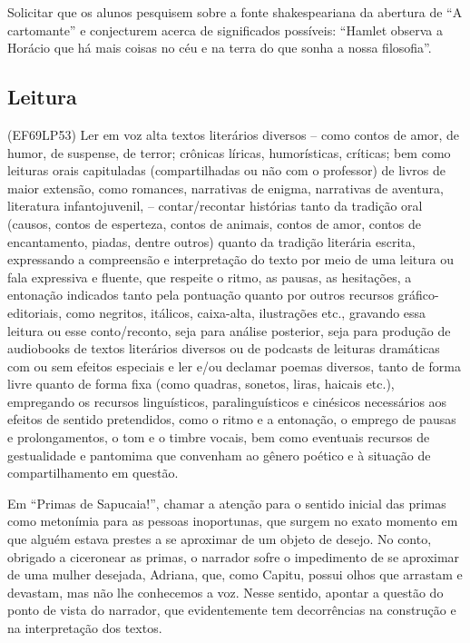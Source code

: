 Solicitar que os alunos pesquisem sobre a fonte shakespeariana da
abertura de ``A cartomante'' e conjecturem acerca de significados
possíveis: ``Hamlet observa a Horácio que há mais coisas no céu e na
terra do que sonha a nossa filosofia''. 

\subsection{Leitura}

(EF69LP53) Ler em voz alta textos literários diversos – como contos de amor, de humor, de suspense, de terror; crônicas líricas, humorísticas, críticas; bem como leituras orais capituladas (compartilhadas ou não com o professor) de livros de maior extensão, como romances, narrativas de enigma, narrativas de aventura, literatura infantojuvenil, – contar/recontar histórias tanto da tradição oral (causos, contos de esperteza, contos de animais, contos de amor, contos de encantamento, piadas, dentre outros) quanto da tradição literária escrita, expressando a compreensão e interpretação do texto por meio de uma leitura ou fala expressiva e fluente, que respeite o ritmo, as pausas, as hesitações, a entonação indicados tanto pela pontuação quanto por outros recursos gráfico-editoriais, como negritos, itálicos, caixa-alta, ilustrações etc., gravando essa leitura ou esse conto/reconto, seja para análise posterior, seja para produção de audiobooks de textos literários diversos ou de podcasts de leituras dramáticas com ou sem efeitos especiais e ler e/ou declamar poemas diversos, tanto de forma livre quanto de forma fixa (como quadras, sonetos, liras, haicais etc.), empregando os recursos linguísticos, paralinguísticos e cinésicos necessários aos efeitos de sentido pretendidos, como o ritmo e a entonação, o emprego de pausas e prolongamentos, o tom e o timbre vocais, bem como eventuais recursos de gestualidade e pantomima que convenham ao gênero poético e à situação de compartilhamento em questão.

Em ``Primas de Sapucaia!'', chamar a atenção para o sentido inicial das
primas como metonímia para as pessoas inoportunas, que surgem no exato
momento em que alguém estava prestes a se aproximar de um objeto de
desejo. No conto, obrigado a ciceronear as primas, o narrador sofre o
impedimento de se aproximar de uma mulher desejada, Adriana, que, como
Capitu, possui olhos que arrastam e devastam, mas não lhe conhecemos a
voz. Nesse sentido, apontar a questão do ponto de vista do narrador, que
evidentemente tem decorrências na construção e na interpretação dos
textos.

